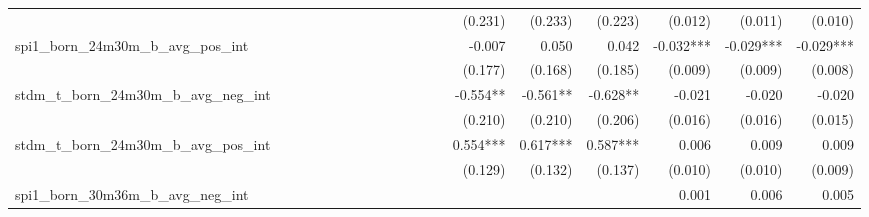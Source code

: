 \begin{tabular}{lrrrrrrrrrrrrrrrrrr}
                                            &              &              &              &              &              &              &              &              &               &              &              &               &      (0.231) &      (0.233) &       (0.223) &      (0.012) &      (0.011) &       (0.010) \\ 
spi1\_born\_24m30m\_b\_avg\_pos\_int        &              &              &              &              &              &              &              &              &               &              &              &               &       -0.007 &        0.050 &         0.042 &    -0.032*** &    -0.029*** &     -0.029*** \\ 
                                            &              &              &              &              &              &              &              &              &               &              &              &               &      (0.177) &      (0.168) &       (0.185) &      (0.009) &      (0.009) &       (0.008) \\ 
stdm\_t\_born\_24m30m\_b\_avg\_neg\_int     &              &              &              &              &              &              &              &              &               &              &              &               &     -0.554** &     -0.561** &      -0.628** &       -0.021 &       -0.020 &        -0.020 \\ 
                                            &              &              &              &              &              &              &              &              &               &              &              &               &      (0.210) &      (0.210) &       (0.206) &      (0.016) &      (0.016) &       (0.015) \\ 
stdm\_t\_born\_24m30m\_b\_avg\_pos\_int     &              &              &              &              &              &              &              &              &               &              &              &               &     0.554*** &     0.617*** &      0.587*** &        0.006 &        0.009 &         0.009 \\ 
                                            &              &              &              &              &              &              &              &              &               &              &              &               &      (0.129) &      (0.132) &       (0.137) &      (0.010) &      (0.010) &       (0.009) \\ 
spi1\_born\_30m36m\_b\_avg\_neg\_int        &              &              &              &              &              &              &              &              &               &              &              &               &              &              &               &        0.001 &        0.006 &         0.005 \\ 

\end{tabular}
